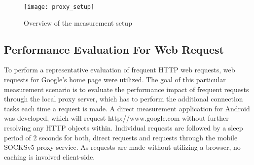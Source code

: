 \begin{figure}
\centering
\texttt{[image: proxy\_setup]}
\caption{Overview of the measurement setup}
\label{fig:proxy_setup}
\end{figure}

\subsection*{Performance Evaluation For Web Request}
To perform a representative evaluation of frequent HTTP
web requests, web requests for Google’s home page were utilized.
The goal of this particular measurement scenario is to evaluate
the performance impact of frequent requests through the local
proxy server, which has to perform the additional connection
tasks each time a request is made. A direct
measurement application for Android was developed, which will request http://www.google.com without further resolving any
HTTP objects within. Individual requests are followed by a
sleep period of 2 seconds for both, direct requests and requests
through the mobile SOCKSv5 proxy service. As requests are
made without utilizing a browser, no caching is involved
client-side.

